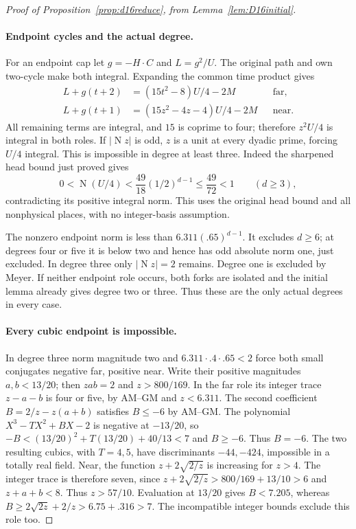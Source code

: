 \documentclass[11pt]{article}
\newcommand{\N}{\operatorname{N}}
\begin{document}
\begin{proof}[Proof of Proposition~\ref{prop:d16reduce}, from
Lemma~\ref{lem:D16initial}]
\paragraph{Endpoint cycles and the actual degree.}
For an endpoint cap let $g=-H\cdot C$ and $L=g^2/U$.
The original path and own two-cycle make both integral. Expanding
the common time product gives
\[
\begin{aligned}
L+g(t+2)&=(15t^2-8)U/4-2M&&\text{far},\\
L+g(t+1)&=(15z^2-4z-4)U/4-2M&&\text{near}.
\end{aligned}
\]
All remaining terms are integral, and $15$ is coprime to four;
therefore $z^2U/4$ is integral in both roles.
If $|\N z|$ is odd, $z$ is a unit at every dyadic prime, forcing
$U/4$ integral. This is impossible in degree at least three.
Indeed the sharpened head bound just proved gives
\[
 0<\N(U/4)<\frac{49}{18}(1/2)^{d-1}\le\frac{49}{72}<1
 \qquad(d\ge3),
\]
contradicting its positive integral norm. This uses the original
head bound and all nonphysical places, with no integer-basis assumption.

The nonzero endpoint norm is less than $6.311(.65)^{d-1}$.
It excludes $d\ge6$; at degrees four or five it is below two and
hence has odd absolute norm one, just excluded. In degree three
only $|\N z|=2$ remains. Degree one is excluded by Meyer.
If neither endpoint role occurs, both forks are isolated and the
initial lemma already gives degree two or three. Thus these are the
only actual degrees in every case.

\paragraph{Every cubic endpoint is impossible.}
In degree three norm magnitude two and
$6.311\cdot.4\cdot.65<2$ force both small conjugates negative
far, positive near. Write their positive magnitudes $a,b<13/20$;
then $zab=2$ and $z>800/169$.
In the far role its integer trace $z-a-b$ is four or five, by
AM--GM and $z<6.311$. The second coefficient
$B=2/z-z(a+b)$ satisfies $B\le-6$ by AM--GM.
The polynomial $X^3-TX^2+BX-2$ is negative at $-13/20$,
so $-B<(13/20)^2+T(13/20)+40/13<7$ and $B\ge-6$.
Thus $B=-6$. The two resulting cubics, with $T=4,5$, have
discriminants $-44,-424$, impossible in a totally real field.
Near, the function $z+2\sqrt{2/z}$ is increasing for $z>4$.
The integer trace is therefore seven, since
$z+2\sqrt{2/z}>800/169+13/10>6$ and $z+a+b<8$.
Thus $z>57/10$. Evaluation at $13/20$ gives $B<7.205$,
whereas $B\ge2\sqrt{2z}+2/z>6.75+.316>7$.
The incompatible integer bounds exclude this role too.


\end{proof}
\end{document}
